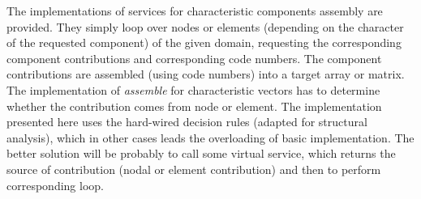 \documentclass[12pt,draft]{article}
\newcommand{\service}[1]{{\em #1}}
\begin{document}
The implementations of services for characteristic components assembly
are provided. They simply loop over nodes or elements (depending on
the character of the requested component) of the given domain, requesting the
corresponding component contributions and corresponding code numbers. 
The component contributions are assembled (using code numbers) into
a target array or matrix. The implementation of \service{assemble} for
characteristic vectors has to determine whether the contribution comes
from node or element. The implementation presented here uses the
hard-wired decision rules (adapted for structural analysis), 
which in other cases leads the overloading of basic implementation. 
The better solution will be probably to call some virtual service,
which returns the source of contribution (nodal or element
contribution) and then to perform corresponding loop.
\end{document}

